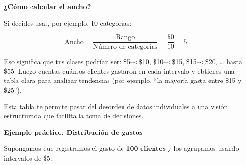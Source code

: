 \documentclass[
  spanish,
  letterpaper,
  DIV=11,
  numbers=noendperiod]{scrreprt}
\begin{document}
\textbf{¿Cómo calcular el ancho?}

Si decides usar, por ejemplo, 10 categorías:

\[
\text{Ancho} = \frac{\text{Rango}}{\text{Número de categorías}} = \frac{50}{10} = 5
\]

Eso significa que tus clases podrían ser: \$5--\textless\$10,
\$10--\textless\$15, \$15--\textless\$20, \ldots{} hasta \$55. Luego
cuentas cuántos clientes gastaron en cada intervalo y obtienes una tabla
clara para analizar tendencias (por ejemplo, ``la mayoría gasta entre
\$15 y \$25'').

Esta tabla te permite pasar del desorden de datos individuales a una
visión estructurada que facilita la toma de decisiones.

\textbf{Ejemplo práctico: Distribución de gastos}

Supongamos que registramos el gasto de \textbf{100 clientes} y los
agrupamos usando intervalos de \$5:
\end{document}
